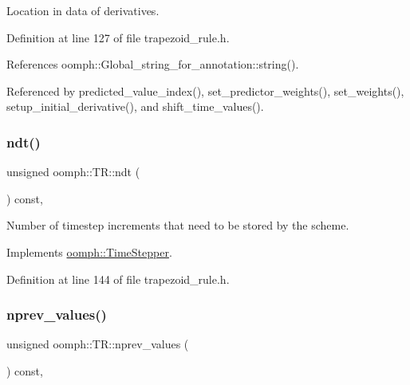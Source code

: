 Location in data of derivatives. 



Definition at line 127 of file trapezoid\+\_\+rule.\+h.



References oomph\+::\+Global\+\_\+string\+\_\+for\+\_\+annotation\+::string().



Referenced by predicted\+\_\+value\+\_\+index(), set\+\_\+predictor\+\_\+weights(), set\+\_\+weights(), setup\+\_\+initial\+\_\+derivative(), and shift\+\_\+time\+\_\+values().

\mbox{\label{classoomph_1_1TR_ac41d1d10629140a3a18da92701d3b5a5}} 
\subsubsection{\texorpdfstring{ndt()}{ndt()}}
{\footnotesize\ttfamily unsigned oomph\+::\+T\+R\+::ndt (\begin{DoxyParamCaption}{ }\end{DoxyParamCaption}) const\hspace{0.3cm}{\ttfamily [inline]}, {\ttfamily [virtual]}}



Number of timestep increments that need to be stored by the scheme. 



Implements \hyperlink{classoomph_1_1TimeStepper_a00e57b6436cff4fc82af481b81a78a1a}{oomph\+::\+Time\+Stepper}.



Definition at line 144 of file trapezoid\+\_\+rule.\+h.

\mbox{\label{classoomph_1_1TR_ac9b61bc12fc5657d4d5a0797b0097d38}} 
\subsubsection{\texorpdfstring{nprev\+\_\+values()}{nprev\_values()}}
{\footnotesize\ttfamily unsigned oomph\+::\+T\+R\+::nprev\+\_\+values (\begin{DoxyParamCaption}{ }\end{DoxyParamCaption}) const\hspace{0.3cm}{\ttfamily [inline]}, {\ttfamily [virtual]}}



